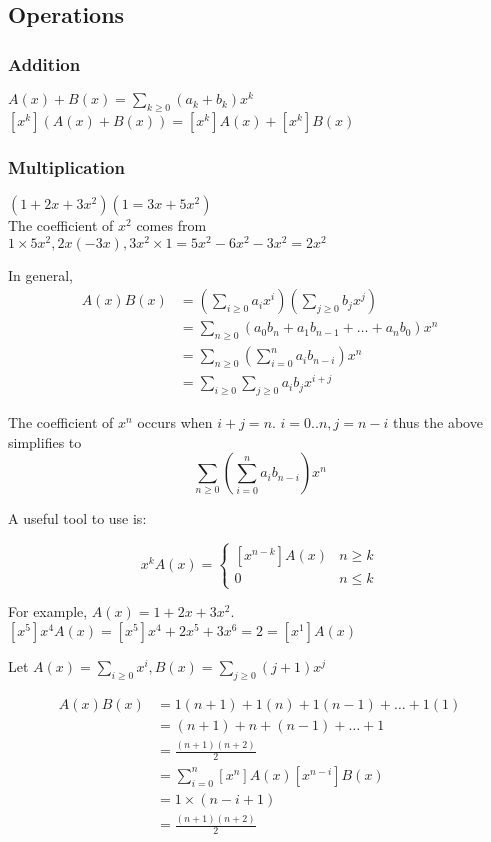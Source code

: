 \documentclass{article}
\begin{document}
\subsection{Operations}

\subsubsection{Addition}
$A(x) + B(x) = \sum_{k \geq 0} (a_k + b_k)x^k$ \\
$[x^k](A(x) + B(x)) = [x^k]A(x) + [x^k]B(x)$

\subsubsection{Multiplication}
\example
$(1+2x+3x^2)(1=3x+5x^2)$\\
The coefficient of $x^2$ comes from $1 \times 5x^2, 2x(-3x), 3x^2 \times 1 = 5x^2 - 6x^2 - 3x^2 = 2x^2$

In general, 
\begin{align*}
	A(x)B(x) &= (\sum_{i \geq 0} a_ix^i)(\sum_{j \geq 0} b_jx^j)\\
	& = \sum_{n \geq 0} (a_0b_n + a_1b_{n-1} + \dots + a_nb_0)x^n\\
	& = \sum_{n \geq 0}(\sum_{i = 0}^{n}a_ib_{n-i})x^n\\
	& = \sum_{i \geq 0} \sum_{j \geq 0} a_ib_jx^{i+j}
\end{align*}

The coefficient of $x^n$ occurs when $i+j = n$. $i = 0..n, j = n - i$ thus the above simplifies to $$\sum_{n \geq 0}(\sum_{i = 0}^{n}a_ib_{n-i})x^n$$

A useful tool to use is: 

\begin{displaymath}
	[x^n]x^kA(x) = \left\{
	\begin{array}{lr}
		[x^{n-k}]A(x) & n \ge k\\
		0 & n \le k
	\end{array}
	\right.
\end{displaymath}

For example, $A(x) = 1 + 2x + 3x^2$. $[x^5]x^4A(x) = [x^5]x^4+2x^5+3x^6 = 2 = [x^1]A(x)$

\example
Let $A(x) = \sum_{i \geq 0} x^i, B(x) = \sum_{j \geq 0}(j+1)x^j$

\begin{align*}
[x^n]A(x)B(x) &= 1(n+1) + 1(n) + 1(n-1) + \dots + 1(1)\\
& = (n+1) + n + (n-1) + \dots + 1\\
& = \frac{(n+1)(n+2)}{2}\\
& = \sum_{i=0}^{n}[x^n]A(x)[x^{n-i}]B(x)\\
& = 1 \times (n - i + 1)\\
& = \frac{(n+1)(n+2)}{2}
\end{align*}
\end{document}
